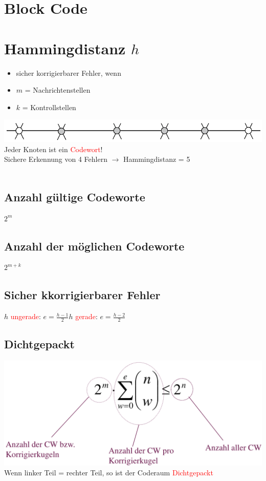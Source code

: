 
\section{Block Code}






\section{Hammingdistanz $h$}
\begin{itemize}
    \item sicher korrigierbarer Fehler, wenn
    \item $m$ = Nachrichtenstellen
    \item $k$ = Kontrollstellen
\end{itemize}
\includegraphics[width=\linewidth]{graphic/extern-reto/Hammingdistanz.png}
Jeder Knoten ist ein \textcolor{red}{Codewort}!\\
Sichere Erkennung von 4 Fehlern $\rightarrow$ Hammingdistanz = 5\\\\
\subsection{Anzahl gültige Codeworte}
\colorbox{lightlightgrey}{$2^m$}
\subsection{Anzahl der möglichen Codeworte}
\colorbox{lightlightgrey}{$2^{m+k}$}
\subsection{Sicher kkorrigierbarer Fehler}
$h$ \textcolor{red}{ungerade}: \colorbox{lightlightgrey}{$e = \frac{h - 1}{2}$}\hspace{3cm}$h$ \textcolor{red}{gerade}: \colorbox{lightlightgrey}{$e = \frac{h - 2}{2}$}
\subsection{Dichtgepackt}
\includegraphics[width=\linewidth]{graphic/extern-reto/Dichtgepackt.png}\\
Wenn linker Teil = rechter Teil, so ist der Coderaum \textcolor{red}{Dichtgepackt}








